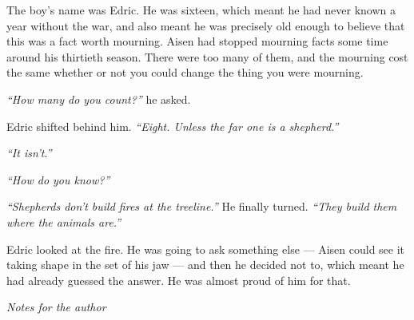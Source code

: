 \documentclass[12pt, a4paper, twoside, openright]{book}
\newcommand{\SceneLocation}{The Grey Mountains}
\newcommand{\SceneBreak}{%
  \vspace{14pt}%
  \begin{center}%
    {\color{StoneLight}\small
      \textperiodcentered\quad\textperiodcentered\quad\textperiodcentered}%
  \end{center}%
  \vspace{10pt}}
\begin{document}
The boy's name was Edric. He was sixteen, which meant he had never
known a year without the war, and also meant he was precisely old
enough to believe that this was a fact worth mourning. Aisen had
stopped mourning facts some time around his thirtieth season.
There were too many of them, and the mourning cost the same whether
or not you could change the thing you were mourning.

\SceneBreak

{\color{Stone}\itshape ``How many do you count?''} he asked.

Edric shifted behind him. {\color{Stone}\itshape ``Eight.
Unless the far one is a shepherd.''}

{\color{Stone}\itshape ``It isn't.''}

{\color{Stone}\itshape ``How do you know?''}

{\color{Stone}\itshape ``Shepherds don't build fires at the
treeline.''} He finally turned.
{\color{Stone}\itshape ``They build them where the animals are.''}

Edric looked at the fire. He was going to ask something else ---
Aisen could see it taking shape in the set of his jaw --- and then
he decided not to, which meant he had already guessed the answer.
He was almost proud of him for that.

\clearpage

\thispagestyle{fancy}
\renewcommand{\SceneLocation}{~}

\vspace*{1.6cm}
{\color{Ink}\fontsize{14}{18}\selectfont\itshape Notes for the author}

\vspace{4pt}{\color{StoneLight}\rule{\linewidth}{0.25pt}}\vspace{10pt}
\end{document}
